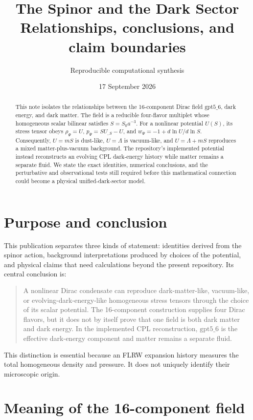 \documentclass[11pt]{article}
\title{The \texorpdfstring{\gptfield}{gpt5-6} Spinor and the Dark Sector\\
\large Relationships, conclusions, and claim boundaries}
\author{Reproducible computational synthesis}
\date{17 September 2026}
\newcommand{\gptfield}{\ensuremath{\mathrm{gpt5\_6}}}
\begin{document}
\maketitle

\begin{abstract}
This note isolates the relationships between the 16-component Dirac field
\gptfield{}, dark energy, and dark matter.  The field is a reducible
four-flavor multiplet whose homogeneous scalar bilinear satisfies
$S=S_0a^{-3}$.  For a nonlinear potential $U(S)$, its stress tensor obeys
$\rho_\Psi=U$, $p_\Psi=SU_{,S}-U$, and
$w_\Psi=-1+d\ln U/d\ln S$.  Consequently, $U=mS$ is dust-like,
$U=\Lambda$ is vacuum-like, and $U=\Lambda+mS$ reproduces a mixed
matter-plus-vacuum background.  The repository's implemented potential instead
reconstructs an evolving CPL dark-energy history while matter remains a
separate fluid.  We state the exact identities, numerical conclusions, and the
perturbative and observational tests still required before this mathematical
connection could become a physical unified-dark-sector model.
\end{abstract}

\tableofcontents

\section{Purpose and conclusion}

This publication separates three kinds of statement: identities derived from
the spinor action, background interpretations produced by choices of the
potential, and physical claims that need calculations beyond the present
repository.  Its central conclusion is:

\begin{quote}
A nonlinear Dirac condensate can reproduce dark-matter-like, vacuum-like, or
evolving-dark-energy-like homogeneous stress tensors through the choice of its
scalar potential.  The 16-component construction supplies four Dirac flavors,
but it does not by itself prove that one field is both dark matter and dark
energy.  In the implemented CPL reconstruction, \gptfield{} is the effective
dark-energy component and matter remains a separate fluid.
\end{quote}

This distinction is essential because an FLRW expansion history measures the
total homogeneous density and pressure.  It does not uniquely identify their
microscopic origin.

\section{Meaning of the 16-component field}
\end{document}
